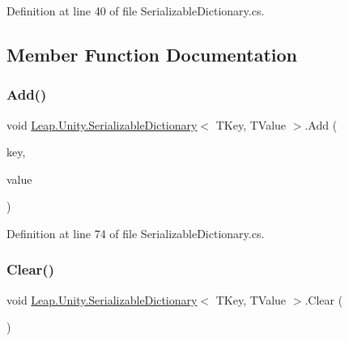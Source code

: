 Definition at line 40 of file Serializable\+Dictionary.\+cs.



\subsection{Member Function Documentation}
\mbox{\label{class_leap_1_1_unity_1_1_serializable_dictionary_ac8288964eb2327f755c683d703e7c1fc}} 
\subsubsection{\texorpdfstring{Add()}{Add()}}
{\footnotesize\ttfamily void \mbox{\hyperlink{class_leap_1_1_unity_1_1_serializable_dictionary}{Leap.\+Unity.\+Serializable\+Dictionary}}$<$ T\+Key, T\+Value $>$.Add (\begin{DoxyParamCaption}\item[{T\+Key}]{key,  }\item[{T\+Value}]{value }\end{DoxyParamCaption})}



Definition at line 74 of file Serializable\+Dictionary.\+cs.

\mbox{\label{class_leap_1_1_unity_1_1_serializable_dictionary_a639b66b29184dc85c510dfa858759552}} 
\subsubsection{\texorpdfstring{Clear()}{Clear()}}
{\footnotesize\ttfamily void \mbox{\hyperlink{class_leap_1_1_unity_1_1_serializable_dictionary}{Leap.\+Unity.\+Serializable\+Dictionary}}$<$ T\+Key, T\+Value $>$.Clear (\begin{DoxyParamCaption}{ }\end{DoxyParamCaption})}



